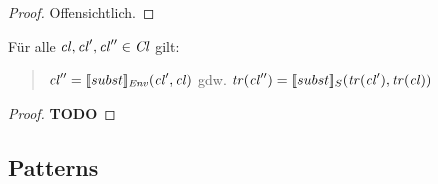 \documentclass[12pt,a4paper]{article}
\begin{document}
\begin{proof}
  Offensichtlich.
\end{proof}

\begin{lemma}
  F\"ur alle $\mathit{cl},\mathit{cl}',\mathit{cl}''\in\mathit{Cl}$ gilt:
  \begin{quote}
    $\mathit{cl}'' = [\![subst]\!]_{\mathit{Env}}(\mathit{cl}',\mathit{cl})$ gdw. $\mathit{tr}(\mathit{cl}'') = [\![subst]\!]_S(\mathit{tr}(\mathit{cl}'),\mathit{tr}(\mathit{cl}))$
  \end{quote}
\end{lemma}

\begin{proof}
  \textbf{TODO}
\end{proof}


\subsection*{Patterns}
\end{document}
